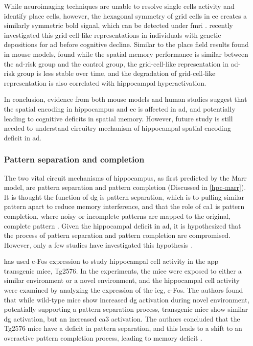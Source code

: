 While neuroimaging techniques are unable to resolve single cells activity and identify place cells, however, the hexagonal symmetry of grid cells in \gls{ec} creates a similarly symmetric \gls{bold} signal, which can be detected under \gls{fmri} \citep{doeller10}. \citet{kunz15} recently investigated this grid-cell-like representations in individuals with genetic depositions for \gls{ad} before cognitive decline. Similar to the place field results found in mouse models, \citet{kunz15} found while the spatial memory performance is similar between the \gls{ad}-risk group and the control group, the grid-cell-like representation in \gls{ad}-risk group is less stable over time, and the degradation of grid-cell-like representation is also correlated with hippocampal hyperactivation. 

In conclusion, evidence from both mouse models and human studies suggest that the spatial encoding in hippocampus and \gls{ec} is affected in \gls{ad}, and potentially leading to cognitive deficits in spatial memory. However, future study is still needed to understand circuitry mechanism of hippocampal spatial encoding deficit in \gls{ad}.

\subsubsection{Pattern separation and completion}
The two vital circuit mechanisms of hippocampus, as first predicted by the Marr model, are pattern separation and pattern completion (Discussed in \ref{hpc-marr}). It is thought the function of \gls{dg} is pattern separation, which is to pulling similar pattern apart to reduce memory interference, and that the role of \gls{ca1} is pattern completion, where noisy or incomplete patterns are mapped to the original, complete pattern \citep{rolls13}. Given the hippocampal deficit in \gls{ad}, it is hypothesized that the process of pattern separation and pattern completion are compromised. However, only a few studies have investigated this hypothesis \citep{maruszak14}. 

\citet{palmer11} has used c-Fos expression to study hippocampal cell activity in the \gls{app} transgenic mice, Tg2576. In the experiments, the mice were exposed to either a similar environment or a novel environment, and the hippocampal cell activity were examined by analyzing the expression of the \gls{ieg}, c-Fos. The authors found that while wild-type mice show increased \gls{dg} activation during novel environment, potentially supporting a pattern separation process, transgenic mice show similar \gls{dg} activation, but an increased \gls{ca3} activation. The authors concluded that the Tg2576 mice have a deficit in pattern separation, and this leads to a shift to an overactive pattern completion process, leading to memory deficit \citep{palmer11}.

